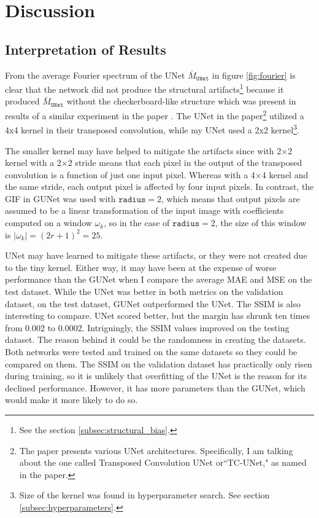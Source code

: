 \chapter{Discussion}
\label{chap:discussion}


\section{Interpretation of Results}
\label{sec:interpretation}

From the average Fourier spectrum of the UNet $\bar{M}_{\texttt{UNet}}$ in figure \ref{fig:fourier} is clear that the network did not produce the structural artifacts\footnote{See the section \ref{subsec:structural_bias}.} because it produced $\bar{M}_{\texttt{UNet}}$ without the checkerboard-like structure which was present in results of a similar experiment in the paper \cite[fig. 3]{gunet}. The UNet in the paper\footnote{The paper \cite{gunet} presents various UNet architectures. Specifically, I am talking about the one called Transposed Convolution UNet or``TC-UNet," as named in the paper.} utilized a 4x4 kernel in their transposed convolution, while my UNet used a 2x2 kernel\footnote{Size of the kernel was found in hyperparameter search. See section \ref{subsec:hyperparameters}.}.

The smaller kernel may have helped to mitigate the artifacts since with 2×2 kernel with a 2×2 stride means that each pixel in the output of the transposed convolution is a function of just one input pixel. Whereas with a 4×4 kernel and the same stride, each output pixel is affected by four input pixels. In contrast, the \gls{GIF} in \gls{GUNet} was used with $\texttt{radius} = 2$, which means that output pixels are assumed to be a linear transformation of the input image with coefficients computed on a window $\omega_k$, so in the case of $\texttt{radius} = 2$, the size of this window is $\left|\omega_k\right| = \left(2r + 1\right)^2 = 25$.

UNet may have learned to mitigate these artifacts, or they were not created due to the tiny kernel. Either way, it may have been at the expense of worse performance than the \gls{GUNet} when I compare the average \gls{MAE} and \gls{MSE} on the test dataset. While the UNet was better in both metrics on the validation dataset, on the test dataset, \gls{GUNet} outperformed the UNet. The \gls{SSIM} is also interesting to compare. UNet scored better, but the margin has shrunk ten times from 0.002 to 0.0002. Intriguingly, the \gls{SSIM} values improved on the testing dataset. The reason behind it could be the randomness in creating the datasets. Both networks were tested and trained on the same datasets so they could be compared on them. The \gls{SSIM} on the validation dataset has practically only risen during training, so it is unlikely that overfitting of the UNet is the reason for its declined performance. However, it has more parameters than the GUNet, which would make it more likely to do so.

